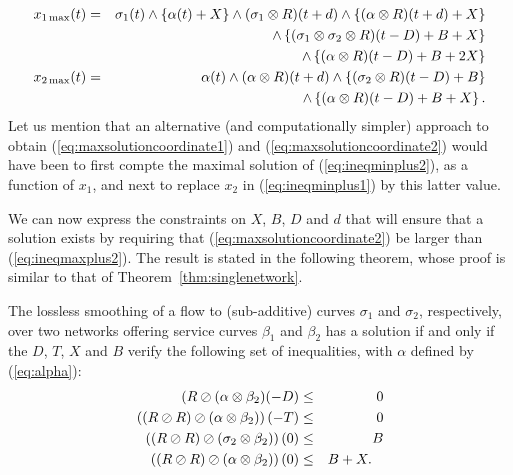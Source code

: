 \begin{eqnarray}
\mylabel{eq:maxsolutioncoordinate1}
x_{1\max}(t)  & = &   \sigma_1 (t) \wedge \{ \alpha(t) + X \}  \wedge   (\sigma_1 \otimes R)(t+d)  \wedge \{ (\alpha \otimes R)(t+d) + X \}   \nonumber \\
        &  & \wedge  \left\{ (\sigma_1 \otimes \sigma_2 \otimes R)(t-D) + B + X \right\}  \nonumber \\
                & & \wedge  \left\{ (\alpha \otimes R)(t-D) + B + 2X \right\} \\
\mylabel{eq:maxsolutioncoordinate2}
x_{2\max}(t) & = &  \alpha (t) \wedge (\alpha \otimes R)(t+d)  \wedge  \left\{ (\sigma_2 \otimes R)(t-D) + B \right\} \nonumber \\
         & & \wedge  \left\{ (\alpha \otimes R)(t-D) + B + X \right\} .
\end{eqnarray}
Let us mention that an alternative (and computationally simpler) approach to obtain (\ref{eq:maxsolutioncoordinate1}) and (\ref{eq:maxsolutioncoordinate2}) would have been to first compte the maximal solution of (\ref{eq:ineqminplus2}), as a function of $x_1$,
and next to replace $x_2$ in  (\ref{eq:ineqminplus1}) by this latter value.

We can now express the constraints on $X$, $B$, $D$ and $d$ that will ensure that a solution exists
by requiring that (\ref{eq:maxsolutioncoordinate2}) be larger than (\ref{eq:ineqmaxplus2}).
The result is stated in the following theorem, whose proof is similar to that of Theorem~\ref{thm:singlenetwork}.

\begin{theorem}
The lossless smoothing of a flow to (sub-additive) curves $\sigma_1$ and $\sigma_2$, respectively, over two networks offering service curves $\beta_1$ and $\beta_2$ has a solution if and only if the  $D$, $T$, $X$ and $B$ verify the following set of inequalities, with $\alpha$ defined by (\ref{eq:alpha}):
\begin{eqnarray}
\mylabel{eq:constraint1two}
 (R \oslash (\alpha \otimes \beta_2) (-D) & \leq & 0 \\
\mylabel{eq:constraint3two}
\left( (R \oslash R) \oslash (\alpha \otimes \beta_2) \right)(-T) & \leq &  0 \\
\mylabel{eq:constraint5two}
\left( (R \oslash R) \oslash (\sigma_2 \otimes \beta_2) \right)(0) & \leq & B \\
\mylabel{eq:constraint6two}
\left( (R \oslash R) \oslash (\alpha \otimes \beta_2) \right)(0) & \leq & B + X. \;\;\;
\end{eqnarray}
\end{theorem}

